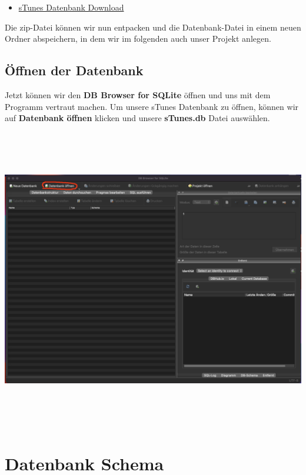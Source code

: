 \documentclass[
]{book}
\providecommand{\tightlist}{%
  \setlength{\itemsep}{0pt}\setlength{\parskip}{0pt}}
\begin{document}
\begin{itemize}
\tightlist
\item
  \href{https://1drv.ms/u/s!AqqMotwB6q520GDacSPl7I49CXPf?e=9ImRO2}{sTunes Datenbank Download}
\end{itemize}

Die zip-Datei können wir nun entpacken und die Datenbank-Datei in einem neuen Ordner abspeichern, in dem wir im folgenden auch unser Projekt anlegen.

\hypertarget{uxf6ffnen-der-datenbank}{%
\section{Öffnen der Datenbank}\label{uxf6ffnen-der-datenbank}}

Jetzt können wir den \textbf{DB Browser for SQLite} öffnen und uns mit dem Programm vertraut machen. Um unsere sTunes Datenbank zu öffnen, können wir auf \textbf{Datenbank öffnen} klicken und unsere \textbf{sTunes.db} Datei auswählen.

\includegraphics[width=\textwidth,height=5.20833in]{img-SQL-DBBrowser1.png}

\hypertarget{datenbank-schema}{%
\chapter{Datenbank Schema}\label{datenbank-schema}}
\end{document}
